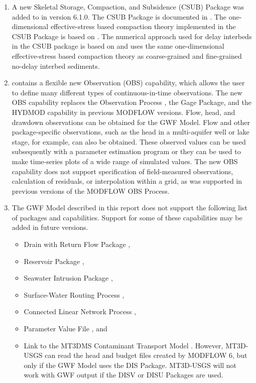 \begin{enumerate}
\item A new Skeletal Storage, Compaction, and Subsidence (CSUB) Package was added to \mf in version 6.1.0. The CSUB Package is documented in \cite{modflow6csub}.  The one-dimensional effective-stress based compaction theory implemented in the CSUB Package is based on \cite{leake2007modflow}. The numerical approach used for delay interbeds in the CSUB package is based on \cite{hoffmann2003modflow} and uses the same one-dimensional effective-stress based compaction theory as coarse-grained and fine-grained no-delay interbed sediments.

\item \mf contains a flexible new Observation (OBS) capability, which allows the user to define many different types of continuous-in-time observations.  The new OBS capability replaces the Observation Process \citep{hill2000modflow}, the Gage Package, and the HYDMOD capability \citep{hanson1999documentation} in previous MODFLOW versions.  Flow, head, and drawdown observations can be obtained for the GWF Model.  Flow and other package-specific observations, such as the head in a multi-aquifer well or lake stage, for example, can also be obtained.  These observed values can be used subsequently with a parameter estimation program or they can be used to make time-series plots of a wide range of simulated values.  The new OBS capability does not support specification of field-measured observations, calculation of residuals, or interpolation within a grid, as was supported in previous versions of the MODFLOW OBS Process.

\item The GWF Model described in this report does not support the following list of packages and capabilities.  Support for some of these capabilities may be added in future \mf versions.
  \begin{itemize}
    \item Drain with Return Flow Package \citep{modflowdrtpack},
    \item Reservoir Package \citep{fenske1996documentation},
    \item Seawater Intrusion Package \citep{bakker2013documentation},
    \item Surface-Water Routing Process \citep{hughes2012documentation},
    \item Connected Linear Network Process \citep{modflowusg},
    \item Parameter Value File \citep{modflow2005}, and
    \item Link to the MT3DMS Contaminant Transport Model \citep{zheng2001modflow}.  However, MT3D-USGS can read the head and budget files created by MODFLOW 6, but only if the GWF Model uses the DIS Package.  MT3D-USGS will not work with GWF output if the DISV or DISU Packages are used.
  \end{itemize}

\end{enumerate}

